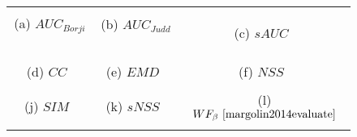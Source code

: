 \documentclass[12pt,onecolumn,journal,	draftclsnofoot]{IEEEtran}
\newlength\figureheight
\newlength\figurewidth
\begin{document}
\newpage
\begin{figure*}[t]
	\centering
	\setlength{\figureheight}{0.1\linewidth}
	\setlength{\figurewidth}{0.2\linewidth}
	\begin{tabular}{ccc}
		\hspace*{-0.3in}
		 & \hspace*{-0.2in}
		 &  \hspace*{-0.2in}
		 \\
		(a) $AUC_{Borji}$~\cite{borjieval}&  (b) $AUC_{Judd}$~\cite{Judd_2012}& (c) $sAUC$~\cite{borjieval} \\
		\hspace*{-0.3in}
		 & \hspace*{-0.2in}
		 & \hspace*{-0.2in}
		 \\
		(d) $CC$~\cite{Judd_2012} & (e) $EMD$~\cite{Judd_2012}  & (f) $NSS$~\cite{NSS}  \\
		\hspace*{-0.3in}
		 & \hspace*{-0.2in}
		 & \hspace*{-0.2in} 
		 \\
		(j) $SIM$~\cite{Judd_2012}  & (k)  $sNSS$~\cite{MilindSamTPAMI} & (l)  $WF_{\beta}~\cite{margolin2014evaluate}$ \\
		\hspace*{-0.3in} 
		 & \hspace*{-0.2in}
		 & \hspace*{-0.2in}
		 

\end{tabular}
\end{figure*}
\end{document}
